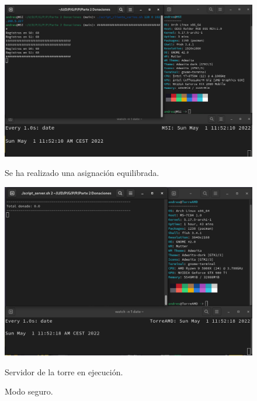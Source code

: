 \documentclass{article}
\begin{document}
\begin{figure}[H]
    \centering
    \begin{minipage}[H]{0.45\textwidth}
        \centering
        \includegraphics[width=\textwidth]{imagenes/multiples ordenadores/Cliente/Screenshot from 2022-05-01 11-52-21.png}
        \caption{Se ha realizado una asignación equilibrada.}
    \end{minipage}
    \hfill
    \begin{minipage}[H]{0.45\textwidth}
        \centering
        \includegraphics[width=\textwidth]{imagenes/multiples ordenadores/Servidor/Screenshot from 2022-05-01 11-52-21.png}
        \caption{Servidor de la torre en ejecución.}
    \end{minipage}
    \caption{Modo seguro.}
\end{figure}
\end{document}
